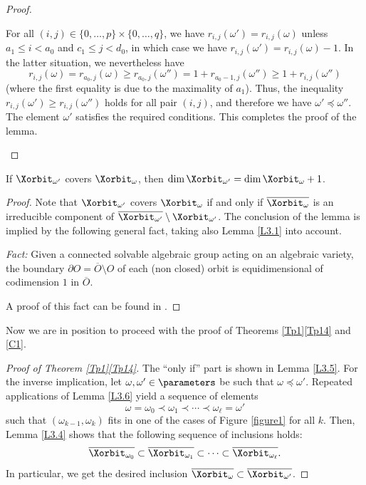 \begin{proof}
\begin{enumerate}[label=\textbf{Case \arabic*}]
For all $(i,j)\in\{0,\ldots,p\}\times\{0,\ldots,q\}$, we have $r_{i,j}(\omega')=r_{i,j}(\omega)$ unless $a_1\leq i<a_0$ and $c_1\leq j<d_0$, in which case we have $r_{i,j}(\omega')=r_{i,j}(\omega)-1$. In the latter situation, we nevertheless have
\[
r_{i,j}(\omega)=r_{a_0,j}(\omega)\geq r_{a_0,j}(\omega'')=1+r_{a_0-1,j}(\omega'')\geq 1+r_{i,j}(\omega'')
\]
(where the first equality is due to the maximality of $a_1$). Thus, the inequality $r_{i,j}(\omega')\geq r_{i,j}(\omega'')$ holds for all pair $(i,j)$, and therefore we have $\omega'\preceq\omega''$. The element $\omega'$ satisfies the required conditions. This completes the proof of the lemma.\qedhere
\end{enumerate}
\end{proof}

\begin{lemma}
\label{L3.7}
If $\Xorbit_{\omega'}$ covers $\Xorbit_\omega$, then $\dim\Xorbit_{\omega'}=\dim\Xorbit_\omega+1$.
\end{lemma}

\begin{proof}
Note that $\Xorbit_{\omega'}$ covers $\Xorbit_\omega$ if and only if $\overline{\Xorbit_\omega}$ is an irreducible component of $\overline{\Xorbit_{\omega'}}\setminus\Xorbit_{\omega'}$.
The conclusion of the lemma is implied by the following general fact, taking also Lemma \ref{L3.1} into account.

\smallskip
\noindent
{\it Fact:} Given a connected solvable algebraic group acting on an algebraic variety, the boundary $\partial O=\overline{O}\setminus O$ of each (non closed) orbit is equidimensional of codimension $1$ in $\overline{O}$.

\smallskip
\noindent
A proof of this fact can be found in \cite[Lemmas 2.12--2.13]{Timashev}.
\end{proof}

Now we are in position to proceed with the proof of Theorems \ref{Tp1}\ref{Tp14} and \ref{C1}.

\begin{proof}[Proof of Theorem \ref{Tp1}\ref{Tp14}] The ``only if'' part is shown in Lemma \ref{L3.5}. For the inverse implication, let $\omega,\omega'\in\parameters$ be such that $\omega\preceq\omega'$. Repeated applications of Lemma \ref{L3.6}
yield a sequence of elements
\[\omega=\omega_0\prec \omega_1\prec\cdots\prec \omega_\ell=\omega'\]
such that $(\omega_{k-1},\omega_k)$ fits in one of the cases of Figure \ref{figure1} for all $k$.
Then, Lemma \ref{L3.4} shows that the following sequence of inclusions holds:
\[\overline{\Xorbit_{\omega_0}}\subset \overline{\Xorbit_{\omega_1}}\subset\cdots\subset \overline{\Xorbit_{\omega_\ell}}.\]
In particular, we get the desired inclusion $\overline{\Xorbit_\omega}\subset\overline{\Xorbit_{\omega'}}$.
\end{proof}

